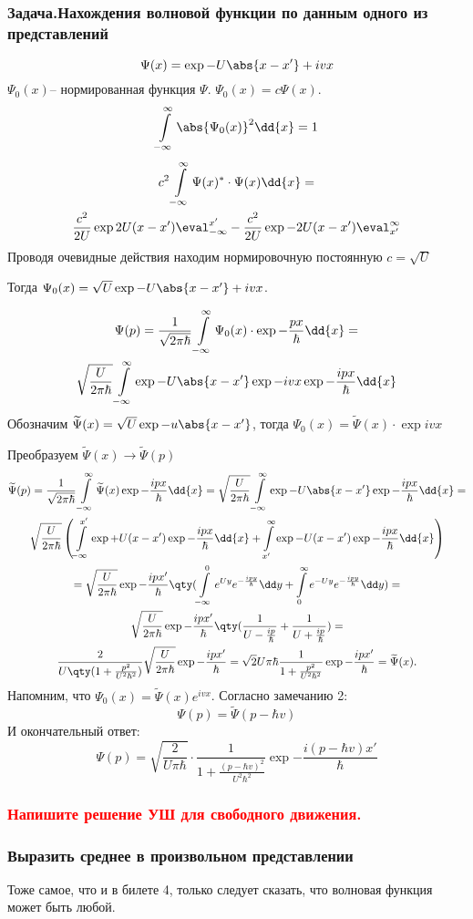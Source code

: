 \subsubsection{Задача.Нахождения волновой функции по данным одного из представлений}

$$\Psi(x)= \exp{-U\abs{x-x'} +ivx  }$$
$\Psi_0(x)$-- нормированная функция $\Psi$. $\Psi_0(x)=c\Psi(x)$.
$$\infint \abs{\Psi_0(x)}^2 \dd{x}=1$$
\begin{gather*}
	c^2\infint \Psi(x)^*\cdot\Psi(x)\dd{x}=
	\\ \frac{c^2}{2U}\exp{2U(x-x')}\eval_{-\infty}^{x'}- 
	\frac{c^2}{2U}\exp{-2U(x-x')}
	\eval^{\infty}_{x'}
\end{gather*}
Проводя очевидные действия находим нормировочную постоянную $c=\sqrt{U}$

Тогда $\Psi_0(x)=\sqrt{U}\exp{-U\abs{x-x'}+ivx}$.

\begin{gather*}
\Psi(p)=\frac{1}{\sqrt{2\pi\hbar}}\infint \Psi_0(x)\cdot\exp{-\frac{px}{\hbar}} \dd{x}=\\
\sqrt\frac{U}{2 \pi \hbar } \infint \exp{-U\abs{x-x'}}\exp{-ivx}\exp{-\frac{ipx}{\hbar}} \dd{x}
\end{gather*}
Обозначим $\tilde{\Psi}(x)=\sqrt{U} \exp{-u\abs{x-x'}}$,
 тогда $\Psi_0(x)=\tilde{\Psi}(x)\cdot\exp{ivx}$

Преобразуем $\tilde{\Psi}(x)\longrightarrow \tilde{\Psi}(p)$ 
\begin{gather*}
	\tilde{\Psi}(p)=\frac{1}{\sqrt{2\pi\hbar}}\infint\tilde\Psi(x)\exp{-\frac{ipx}{\hbar}} \dd{x} =\sqrt{\frac{U}{2 \pi \hbar}} \infint \exp{-U\abs{x-x'}}\exp{-\frac{ipx}{\hbar}}\dd{x} =\\
	\sqrt{\frac{U}{2 \pi \hbar}} \left(
	\int\limits_{-\infty}^{x'} \exp{+U (x-x')}\exp{-\frac{ipx}{\hbar}}\dd{x} 
	+
	\int\limits^{\infty}_{x'} \exp{-U (x-x')}\exp{-\frac{ipx}{\hbar}}\dd{x}
	\right)\\=
	\sqrt{\frac{U}{2 \pi \hbar }}\exp{-\frac{ipx' }{\hbar}}
	\qty
	(\int\limits_{-\infty}^0 e^{Uy} e^{-\frac{ipy}{\hbar}}\dd y+
	\int\limits^{\infty}_0 e^{-Uy} e^{-\frac{ipy}{\hbar}}\dd y
	 )
	 =\\
	 \sqrt{\frac{U}{2 \pi \hbar}} \exp{-\frac{ipx' }{\hbar}} 
	 \qty(\frac{1}{U-\frac{ip}{\hbar}} + \frac{1}{U+\frac{ip}{\hbar}})=\\
	 \frac{2}{U\qty(1+\frac{p^2}{U^2\hbar^2})}\sqrt{\frac{U}{2 \pi \hbar}} \exp{-\frac{ipx'}{\hbar}}=\sqrt{2}{U \pi \hbar} \frac{1}{1+\frac{p^2}{U^2\hbar^2}}\exp{-\frac{ipx' }{\hbar}}=\tilde {\Psi}(x). 
\end{gather*}
Напомним, что $\Psi_0(x)=\tilde\Psi(x)e^{ivx}$. Согласно замечанию 2:
	 $$\Psi(p)=\tilde{\Psi}(p-\hbar v)$$
И окончательный ответ:
	 $$\Psi(p)=\sqrt{\frac{2}{U\pi\hbar}}\cdot\frac{1}{1+\frac{(p-\hbar v)^2}{U^2\hbar^2}}\exp{-\frac{i(p-\hbar v)x' }{\hbar}} $$
\subsubsection{\textcolor{red} {Напишите решение УШ для свободного движения.} }

\subsubsection{{Выразить среднее в произвольном представлении} }

Тоже самое, что и в билете 4, только следует сказать, что волновая функция может быть любой.